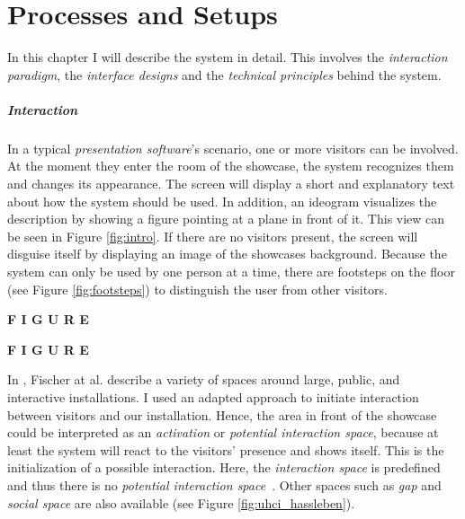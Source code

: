 \chapter{Processes and Setups}
\label{installation}

In this chapter I will describe the system in detail. This involves the \textit{interaction paradigm}, the \textit{interface designs} and the \textit{technical principles} behind the system. 


\paragraph{Interaction} 
In a typical \textit{presentation software}'s scenario, one or more visitors can be involved. At the moment they enter the room of the showcase, the system recognizes them and changes its appearance. The screen will display a short and explanatory text about how the system should be used. In addition, an ideogram visualizes the description by showing a figure pointing at a plane in front of it. This view can be seen in Figure \ref{fig:intro}. If there are no visitors present, the screen will disguise itself by displaying an image of the showcases background. Because the system can only be used by one person at a time, there are footsteps on the floor (see Figure \ref{fig:footsteps}) to distinguish the user from other visitors. 

\textbf{F I G U R E}

\textbf{F I G U R E}

In \cite{UrbanHCI}, Fischer at al. describe a variety of spaces around large, public, and interactive installations. I used an adapted approach to initiate interaction between visitors and our installation. Hence, the area in front of the showcase could be interpreted as an \textit{activation} or \textit{potential interaction space}, because at least the system will react to the visitors' presence and shows itself. This is the initialization of a possible interaction. Here, the \textit{interaction space} is predefined and thus there is no \textit{potential interaction space}~\cite{UrbanHCI}. Other spaces such as \textit{gap} and \textit{social space} are also available (see Figure \ref{fig:uhci_hassleben}). 

